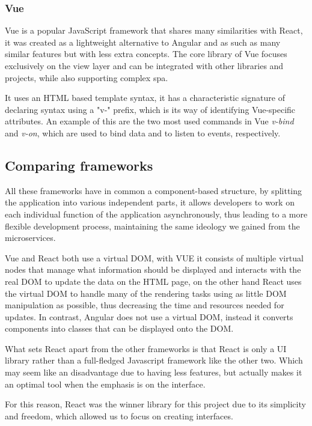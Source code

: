 \subsubsection{Vue}
\label{sss:vue}

Vue is a popular JavaScript framework that shares many similarities with React, it was created as a lightweight alternative to Angular and as such as many similar features but with less extra concepts. The core library of Vue focuses exclusively on the view layer and can be integrated with other libraries and projects, while also supporting complex \acrfull{spa}.

It uses an HTML based template syntax, it has a characteristic signature of declaring syntax using a "v-" prefix, which is its way of identifying Vue-specific attributes. An example of this are the two most used commands in Vue \textit{v-bind} and \textit{v-on}, which are used to bind data and to listen to events, respectively.

\subsection{Comparing frameworks}

All these frameworks have in common a component-based structure, by splitting the application into various independent parts, it allows developers to work on each individual function of the application asynchronously, thus leading to a more flexible development process, maintaining the same ideology we gained from the microservices.

Vue and React both use a virtual DOM, with VUE it consists of multiple virtual nodes that manage what information should be displayed and interacts with the real DOM to update the data on the HTML page, on the other hand React uses the virtual DOM to handle many of the rendering tasks using as little DOM manipulation as possible, thus decreasing the time and resources needed for updates. In contrast, Angular does not use a virtual DOM, instead it converts components into classes that can be displayed onto the DOM.

What sets React apart from the other frameworks is that React is only a UI library rather than a full-fledged Javascript framework like the other two. Which may seem like an disadvantage due to having less features, but actually makes it an optimal tool when the emphasis is on the interface.

For this reason, React was the winner library for this project due to its simplicity and freedom, which allowed us to focus on creating interfaces.

